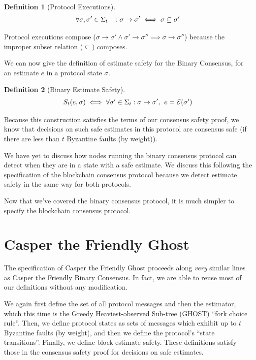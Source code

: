 \documentclass{article}
\theoremstyle{definition}
\newtheorem{defn}{Definition}[section]
\begin{document}
\begin{defn}[Protocol Executions]
\begin{align}
\forall \sigma, \sigma' \in \Sigma_t \hspace{3mm} : \sigma \to \sigma' \iff \sigma \subseteq \sigma'
\end{align}
\end{defn}

Protocol executions compose ($\sigma \to \sigma' \land \sigma' \to \sigma'' \implies \sigma \to \sigma''$) because the improper subset relation ($\subseteq$) composes.

We can now give the definition of estimate safety for the Binary Consensus, for an estimate $e$ in a protocol state $\sigma$.

\begin{defn}[Binary Estimate Safety]
$$
S_t(e, \sigma) \iff \forall \sigma' \in \Sigma_t: \sigma \to \sigma',\hspace{1.5mm} e = \mathcal{E}(\sigma')
$$
\end{defn}

Because this construction satisfies the terms of our consensus safety proof, we know that decisions on such safe estimates in this protocol are consensus safe (if there are less than $t$ Byzantine faults (by weight)).

We have yet to discuss how nodes running the binary consensus protocol can detect when they are in a state with a safe estimate. We discuss this following the specification of the blockchain consensus protocol because we detect estimate safety in the same way for both protocols.

Now that we've covered the binary consensus protocol, it is much simpler to specify the blockchain consensus protocol.


\section{Casper the Friendly Ghost}

The specification of Casper the Friendly Ghost proceeds along \emph{very} similar lines as Casper the Friendly Binary Consensus. In fact, we are able to reuse most of our definitions without any modification.

We again first define the set of all protocol messages and then the estimator, which this time is the Greedy Heaviest-observed Sub-tree (GHOST) ``fork choice rule''. Then, we define protocol states as sets of messages which exhibit up to $t$ Byzantine faults (by weight), and then we define the protocol's ``state transitions''. Finally, we define block estimate safety. These definitions satisfy those in the consensus safety proof for decisions on safe estimates.
\end{document}
